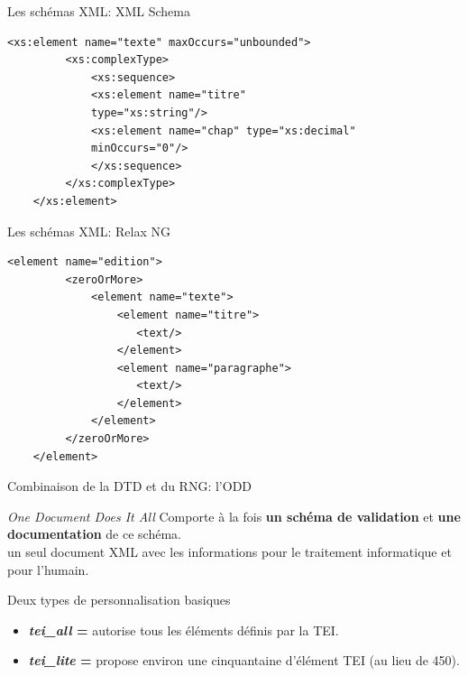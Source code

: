 \begin{frame}[fragile]{Les schémas XML: XML Schema}
    \begin{lstlisting}[numbers=none]
    <xs:element name="texte" maxOccurs="unbounded">
         <xs:complexType>
             <xs:sequence>
             <xs:element name="titre"
             type="xs:string"/>
             <xs:element name="chap" type="xs:decimal"
             minOccurs="0"/>
             </xs:sequence>
         </xs:complexType>
    </xs:element>
    \end{lstlisting}
\end{frame}

\begin{frame}[fragile]{Les schémas XML: Relax NG}
    \begin{lstlisting}[numbers=none]
    <element name="edition">
         <zeroOrMore>
             <element name="texte">
                 <element name="titre">
                    <text/>
                 </element>
                 <element name="paragraphe">
                    <text/>
                 </element>
             </element>
         </zeroOrMore>
    </element>
    \end{lstlisting}
\end{frame}

\begin{frame}{Combinaison de la DTD et du RNG: l'ODD}
\begin{block}{\textit{One Document Does It All}}
\vspace{0.5em}
    Comporte à la fois \textbf{un schéma de validation} et \textbf{une documentation} de ce schéma.\\
    \textrightarrow{} un seul document XML avec les informations pour le traitement informatique et pour l'humain.
\end{block}
\begin{block}{Deux types de personnalisation basiques}
\begin{itemize}
    \item \textbf{\textit{tei\_all} =} autorise tous les éléments définis par la TEI.
    \item \textbf{\textit{tei\_lite} =} propose environ une cinquantaine d'élément TEI (au lieu de 450).
\end{itemize}

\end{block}
    
\end{frame}

